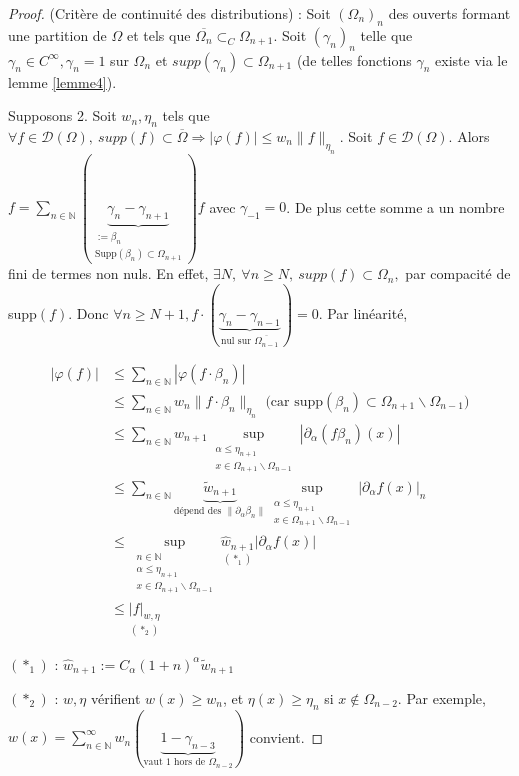 \begin{proof}
    (Critère de continuité des distributions) : Soit $(\Omega_n)_n$ des ouverts formant une partition de $\Omega$ et tels que $\overline{\Omega_n}\subset _C\Omega_{n+1}$.
    Soit $(\gamma_n)_n$  telle que $\gamma_n\in C^\infty , \gamma_n=1$ sur $\Omega_n$ et $supp(\gamma_n)\subset \Omega_{n+1}$ (de telles fonctions $\gamma_n$ existe via le lemme \ref{lemme4}). 

    \medskip
    
    Supposons 2. Soit $w_n, \eta_n$ tels que $\forall f\in \mathcal{D}(\Omega),\ supp(f)\subset \overline{\Omega}\Rightarrow |\varphi (f)|\le w_n\|f\|_{\eta_n}. $  Soit $f\in \mathcal{D}(\Omega).$  Alors $f=\sum\limits_{n\in \mathbb{N} } (\underbrace{\gamma_n-\gamma_{n+1}}_{\substack{{:=\beta_n}\\{\text{Supp}(\beta_n)\subset \Omega_{n+1}}}}) f $ avec $\gamma_{-1}=0$. De plus cette somme a un nombre fini de termes non nuls.
    En effet, $\exists N,\ \forall n\ge N,\ supp(f)\subset \Omega_n, $ par compacité de supp$(f)$. Donc $\forall n\ge N+1,f \cdot (\underbrace{\gamma_n-\gamma_{n-1}}_{\text{nul sur }\overline{\Omega_{n-1}}})=0$.
    Par linéarité,

    \begin{align*}
        |\varphi (f)| &\le \sum\limits_{n\in \mathbb{N} }^{} |\varphi (f \cdot \beta_n)| \\
        &\le \sum\limits_{n\in \mathbb{N} }^{} w_n\|f \cdot \beta_n\|_{\eta_n} \text{ (car supp}(\beta_n)\subset \Omega_{n+1}\backslash \Omega_{n-1}) \\
        &\le \sum\limits_{n\in \mathbb{N} }^{} w_{n+1}\sup_{ \substack{{\alpha \le  \eta_{n+1}} \\ {x\in \Omega_{n+1}\backslash \Omega_{n-1}}} }|\partial_\alpha (f\beta_n)(x)|\\
        &\le \sum_{n\in \mathbb{N} }\underbrace{\tilde{w}_{n+1}}_{\text{dépend des }\|\partial_{\alpha} \beta_n\|} \sup_{ 
\substack{{\alpha \leq \eta_{n+1}} \\ { x \in \Omega_{n+1}\backslash \Omega_{n-1}} }} |\partial _\alpha f(x)|_n \\
        &\le \sup_{\substack{{n\in \mathbb{N}} \\ {\alpha \le \eta_{n+1}} \\ {x\in \Omega_{n+1}\backslash \Omega_{n-1} } } }\underset{(*_1)}{\hat{w}_{n+1}}|\partial_\alpha f(x)| \\
        &\le \underset{(*_2)}{|f|_{w, \eta}}
    \end{align*}
    
    $(*_1)$ : $\hat{w}_{n+1}:=C_\alpha (1+n)^\alpha \tilde{w}_{n+1}$ 

    \medskip
    
    $(*_2)$ : $w, \eta$  vérifient $w(x)\ge w_n$, et $ \eta(x)\ge \eta_n$ si $x\not\in \Omega_{n-2}$.
 Par exemple, $w(x)=\sum\limits_{n\in \mathbb{N} }^{\infty} w_n(\underbrace{1-\gamma_{n-3}}_{\text{vaut 1 hors de $\Omega_{n-2}$}})$ convient.
\end{proof}




